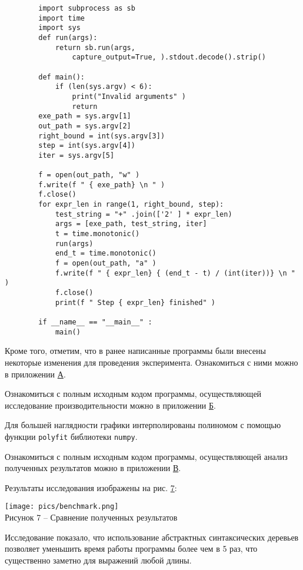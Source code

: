 \documentclass[bachelor, och, coursework]{SCWorks}
\begin{document}
    \begin{verbatim}
        import subprocess as sb
        import time
        import sys
        def run(args):
            return sb.run(args,
                capture_output=True, ).stdout.decode().strip()

        def main():
            if (len(sys.argv) < 6):
                print("Invalid arguments" )
                return
        exe_path = sys.argv[1]
        out_path = sys.argv[2]
        right_bound = int(sys.argv[3])
        step = int(sys.argv[4])
        iter = sys.argv[5]

        f = open(out_path, "w" )
        f.write(f " { exe_path} \n " )
        f.close()
        for expr_len in range(1, right_bound, step):
            test_string = "+" .join(['2' ] * expr_len)
            args = [exe_path, test_string, iter]
            t = time.monotonic()
            run(args)
            end_t = time.monotonic()
            f = open(out_path, "a" )
            f.write(f " { expr_len} { (end_t - t) / (int(iter))} \n " )
            f.close()
            print(f " Step { expr_len} finished" )

        if __name__ == "__main__" :
            main()
    \end{verbatim}

    Кроме того, отметим, что в ранее написанные программы были внесены некоторые изменения для 
    проведения эксперимента. Ознакомиться с ними можно в приложении \hyperref[А]{А}.

    Ознакомиться с полным исходным кодом программы, осуществляющей 
    исследование производительности можно в приложении \hyperref[Б]{Б}.

    Для большей наглядности графики интерполированы полиномом с помощью функции \verb"polyfit" библиотеки \verb"numpy".

    Ознакомиться с полным исходным кодом программы, осуществляющей 
    анализ полученных результатов можно в приложении \hyperref[В]{В}.

    Результаты исследования изображены на рис. \hyperref[7]{7}:
    
    \begin{center}
        \texttt{[image: pics/benchmark.png]}\\
        {\small Рисунок  7 – Сравнение полученных результатов}\label{7}
    \end{center}

    Исследование показало, что использование абстрактных синтаксических деревьев позволяет уменьшить время 
    работы программы более чем в 5 раз, что существенно заметно для выражений любой длины.
\end{document}
